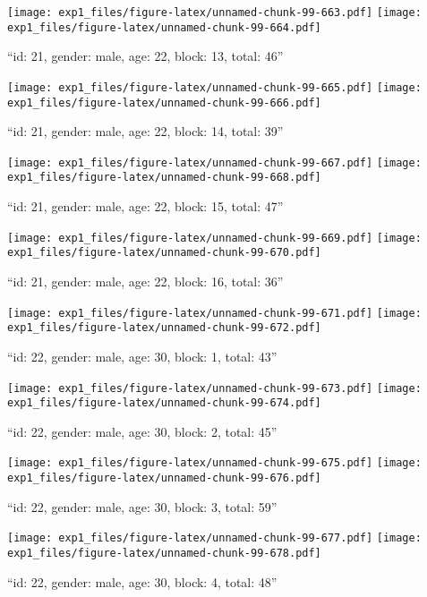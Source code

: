 \documentclass[,]{article}
\begin{document}
\texttt{[image: exp1\_files/figure-latex/unnamed-chunk-99-663.pdf]}
\texttt{[image: exp1\_files/figure-latex/unnamed-chunk-99-664.pdf]}

\newpage
[1] 

``id: 21, gender: male, age: 22, block: 13, total: 46''

\texttt{[image: exp1\_files/figure-latex/unnamed-chunk-99-665.pdf]}
\texttt{[image: exp1\_files/figure-latex/unnamed-chunk-99-666.pdf]}

\newpage
[1] 

``id: 21, gender: male, age: 22, block: 14, total: 39''

\texttt{[image: exp1\_files/figure-latex/unnamed-chunk-99-667.pdf]}
\texttt{[image: exp1\_files/figure-latex/unnamed-chunk-99-668.pdf]}

\newpage
[1] 

``id: 21, gender: male, age: 22, block: 15, total: 47''

\texttt{[image: exp1\_files/figure-latex/unnamed-chunk-99-669.pdf]}
\texttt{[image: exp1\_files/figure-latex/unnamed-chunk-99-670.pdf]}

\newpage
[1] 

``id: 21, gender: male, age: 22, block: 16, total: 36''

\texttt{[image: exp1\_files/figure-latex/unnamed-chunk-99-671.pdf]}
\texttt{[image: exp1\_files/figure-latex/unnamed-chunk-99-672.pdf]}

\newpage
[1] 

``id: 22, gender: male, age: 30, block: 1, total: 43''

\texttt{[image: exp1\_files/figure-latex/unnamed-chunk-99-673.pdf]}
\texttt{[image: exp1\_files/figure-latex/unnamed-chunk-99-674.pdf]}

\newpage
[1] 

``id: 22, gender: male, age: 30, block: 2, total: 45''

\texttt{[image: exp1\_files/figure-latex/unnamed-chunk-99-675.pdf]}
\texttt{[image: exp1\_files/figure-latex/unnamed-chunk-99-676.pdf]}

\newpage
[1] 

``id: 22, gender: male, age: 30, block: 3, total: 59''

\texttt{[image: exp1\_files/figure-latex/unnamed-chunk-99-677.pdf]}
\texttt{[image: exp1\_files/figure-latex/unnamed-chunk-99-678.pdf]}

\newpage
[1] 

``id: 22, gender: male, age: 30, block: 4, total: 48''
\end{document}
